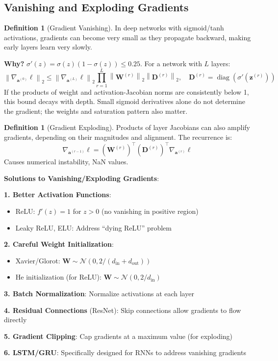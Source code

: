 \documentclass[11pt,twoside]{article}
\numberwithin{equation}{section}
\newcommand{\vect}[1]{\bm{#1}}
\newcommand{\mat}[1]{\bm{#1}}
\newcommand{\norm}[1]{\left\lVert#1\right\rVert}
\theoremstyle{plain}
\theoremstyle{definition}
\newtheorem{definition}[theorem]{Definition}
\theoremstyle{remark}
\newenvironment{keyidea}{
  \begin{tcolorbox}[colback=yellow!5!white,
                    colframe=yellow!50!black,
                    title=Key Idea,
                    breakable,
                    enhanced,
                    sharp corners,
                    boxrule=0.8pt,
                    left=6pt, right=6pt, top=6pt, bottom=6pt]
}{
  \end{tcolorbox}
}
\begin{document}
\subsection{Vanishing and Exploding Gradients}

\begin{definition}[Gradient Vanishing]
In deep networks with sigmoid/tanh activations, gradients can become very small as they propagate backward, making early layers learn very slowly.

\textbf{Why?} $\sigma'(z) = \sigma(z)(1-\sigma(z)) \leq 0.25$. For a network with $L$ layers:
\[
\norm{\nabla_{\vect{a}^{(0)}}\ell}_2
\leq \norm{\nabla_{\vect{a}^{(L)}}\ell}_2
\prod_{r=1}^{L}\norm{\vect{W}^{(r)}}_2\norm{\mat{D}^{(r)}}_2,
\quad \mat{D}^{(r)}=\operatorname{diag}(\sigma'(\vect{z}^{(r)}))
\]
If the products of weight and activation-Jacobian norms are consistently below 1, this bound decays with depth. Small sigmoid derivatives alone do not determine the gradient; the weights and saturation pattern also matter.
\end{definition}

\begin{definition}[Gradient Exploding]
Products of layer Jacobians can also amplify gradients, depending on their magnitudes and alignment. The recurrence is:
\[
\nabla_{\vect{a}^{(r-1)}}\ell=(\vect{W}^{(r)})^\top(\mat{D}^{(r)})^\top\nabla_{\vect{a}^{(r)}}\ell
\]
Causes numerical instability, NaN values.
\end{definition}

\begin{keyidea}
\textbf{Solutions to Vanishing/Exploding Gradients}:

\textbf{1. Better Activation Functions}:
\begin{itemize}
\item ReLU: $f'(z) = 1$ for $z > 0$ (no vanishing in positive region)
\item Leaky ReLU, ELU: Address ``dying ReLU'' problem
\end{itemize}

\textbf{2. Careful Weight Initialization}:
\begin{itemize}
\item Xavier/Glorot: $\vect{W} \sim \mathcal{N}(0, 2/(d_{\text{in}} + d_{\text{out}}))$
\item He initialization (for ReLU): $\vect{W} \sim \mathcal{N}(0, 2/d_{\text{in}})$
\end{itemize}

\textbf{3. Batch Normalization}: Normalize activations at each layer

\textbf{4. Residual Connections} (ResNet): Skip connections allow gradients to flow directly

\textbf{5. Gradient Clipping}: Cap gradients at a maximum value (for exploding)

\textbf{6. LSTM/GRU}: Specifically designed for RNNs to address vanishing gradients
\end{keyidea}
\end{document}

